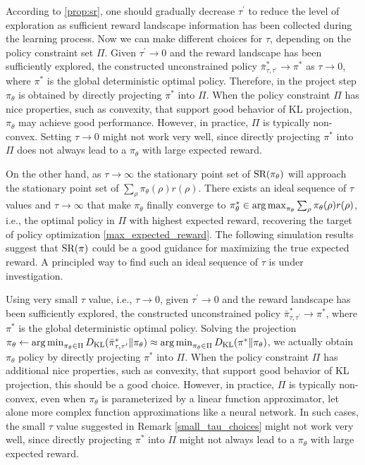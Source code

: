 According to \cref{prop:sr}, one should gradually decrease $\tau^{\prime}$ to reduce the level of exploration as sufficient reward landscape information has been collected during the learning process. Now we can make different choices for $\tau$, depending on the policy constraint set $\Pi$.
Given $\tau^{\prime} \to 0$ and the reward landscape has been sufficiently explored,
the constructed unconstrained policy $\bar{\pi}_{\tau,\tau^{\prime}}^* \to \pi^*$ as $\tau \to 0$, where $\pi^*$ is the global deterministic optimal policy. 
Therefore, in the project step $\pi_\theta$ is obtained by directly projecting $\pi^*$ into $\Pi$. When the policy constraint $\Pi$ has nice properties, such as convexity, that support good behavior of KL projection, $\pi_\theta$ may achieve good performance.
However, in practice, $\Pi$ is typically non-convex. Setting $\tau \to 0$ might not work very well, since directly projecting $\pi^*$ into $\Pi$ does not always lead to a $\pi_\theta$ with large expected reward.

On the other hand, as $\tau \to \infty$ the stationary point set of $\text{SR}(\pi_\theta)$ will approach the stationary point set of $\sum_{\rho}{ \pi_\theta(\rho) r(\rho) }$.
There exists an ideal sequence of $\tau$ values and $\tau \to \infty$ that make $\pi_\theta$ finally converge to $\pi_\theta^* \in \operatorname*{arg\,max}_{\pi_\theta}{ \sum_{\rho}{\pi_\theta(\rho) r(\rho)} }$, i.e., the optimal policy in $\Pi$ with highest expected reward, recovering the target of policy optimization \cref{max_expected_reward}. 
The following simulation results suggest that $\text{SR}(\pi)$ could be a good guidance for maximizing the true expected reward.
A principled way to find such an ideal sequence of $\tau$ is under investigation.

Using very small $\tau$ value, i.e., $\tau \to 0$, given $\tau^{\prime} \to 0$ and the reward landscape has been sufficiently explored, the constructed unconstrained policy $\bar{\pi}_{\tau,\tau^{\prime}}^* \to \pi^*$, where $\pi^*$ is the global deterministic optimal policy. Solving the projection $\pi_\theta \leftarrow \operatorname*{arg\,min}_{\pi_\theta \in \Pi}{D_{\mathrm{KL}}(\bar{\pi}_{\tau,\tau^{\prime}}^* \| \pi_\theta}) \approx \operatorname*{arg\,min}_{\pi_\theta \in \Pi}{D_{\mathrm{KL}}(\pi^* \| \pi_\theta})$, we actually obtain $\pi_\theta$ policy by directly projecting $\pi^*$ into $\Pi$. When the policy constraint $\Pi$ has additional nice properties, such as convexity, that support good behavior of KL projection, this should be a good choice.
However, in practice, $\Pi$ is typically non-convex, even when $\pi_\theta$ is parameterized by a linear function approximator, let alone more complex function approximations like a neural network. In such cases, the small $\tau$ value suggested in Remark \ref{small_tau_choices} might not work very well, since directly projecting $\pi^*$ into $\Pi$ might not always lead to a $\pi_\theta$ with large expected reward.

